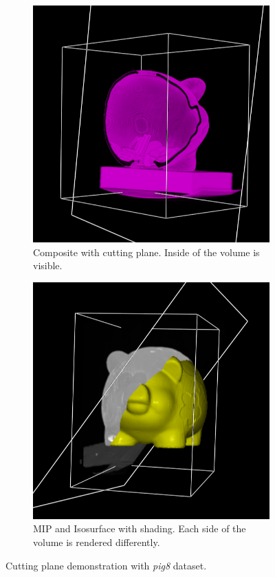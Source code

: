 \documentclass[a4paper]{article}
\begin{document}
\begin{figure}[h]
  \centering
  \begin{subfigure}[b]{0.45\textwidth}
    \centering
    \includegraphics[width=\textwidth]{pig8-cut-plane-coins}
    \caption{Composite with cutting plane. Inside of the volume is visible.}
  \end{subfigure}
  \hfill
  \begin{subfigure}[b]{0.45\textwidth}
    \centering
    \includegraphics[width=\textwidth]{pig8-cut-plane-renders}
    \caption{MIP and Isosurface with shading. Each side of the volume is rendered differently.}
  \end{subfigure}
  \caption{Cutting plane demonstration with \textit{pig8} dataset.}
  \label{fig:cutplane}
\end{figure}
\end{document}
